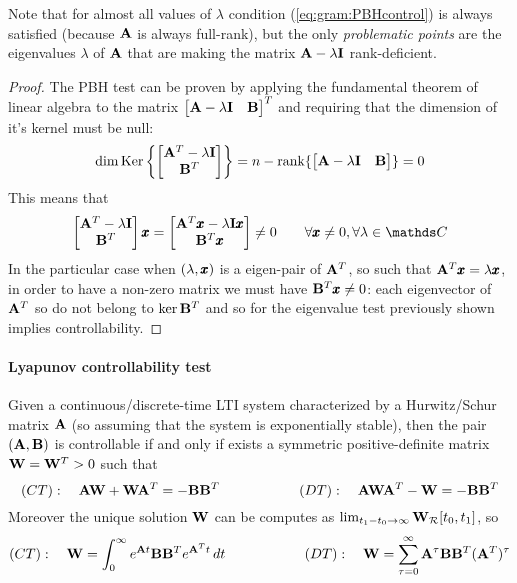 	Note that for almost all values of $\lambda$ condition (\ref{eq:gram:PBHcontrol}) is always satisfied (because $\mathbf{A}$ is always full-rank), but the only \textit{problematic points} are the eigenvalues $\lambda$ of $\mathbf{A}$ that are making the matrix $\mathbf{A}-\lambda\mathbf{I}$ rank-deficient.
	
	\begin{proof}
		The PBH test can be proven by applying the fundamental theorem of linear algebra to the matrix $\begin{bmatrix} \mathbf{A}-\lambda\mathbf{I}&\mathbf{B} \end{bmatrix}^T$ and requiring that the dimension of it's kernel must be null:
		\[ \dim \textrm{Ker}\left\{\begin{bmatrix} \mathbf{A}^T-\lambda \mathbf{I} \\ \mathbf{B}^T \end{bmatrix}\right\} = n - \textrm{rank}\{\begin{bmatrix} \mathbf{A}-\lambda\mathbf{I} & \mathbf{B} \end{bmatrix}\} = 0 \]
		This means that
		\[ \matrix{\A^T-\lambda\I \\ \B^T} \x = \matrix{\A^T \x - \lambda\I\x \\ \B^T\x} \neq 0 \qquad \forall \x \neq 0, \forall \lambda \in \mathds C \]
		In the particular case when $(\lambda,\pmb{x})$ is a eigen-pair of $\mathbf{A}^T$, so such that $\mathbf{A}^T\pmb{x} = \lambda\pmb{x}$, in order to have a non-zero matrix we must have $\mathbf{B}^T\pmb{x} \neq 0$: each eigenvector of $\mathbf{A}^T$ so do not belong to $\ker \mathbf{B}^T$ and so for the eigenvalue test previously shown implies controllability.		
	\end{proof}

	\paragraph{Lyapunov controllability test} Given a continuous/discrete-time LTI system characterized by a Hurwitz/Schur matrix $\mathbf{A}$ (so assuming that the system is exponentially stable), then the pair $(\mathbf{A},\mathbf{B})$ is controllable if and only if exists a symmetric positive-definite matrix $\mathbf{W} = \mathbf{W}^T > 0$ such that
	\begin{equation} \label{eq:gram:temp6}
		(CT):\quad \mathbf{A} \mathbf{W} + \mathbf{W} \mathbf{A}^T = - \mathbf{B}\mathbf{B}^T \hspace{2cm} (DT): \quad \mathbf{A} \mathbf{W} \mathbf{A}^T - \mathbf{W} = - \mathbf{B} \mathbf{B}^T
	\end{equation}
	Moreover the unique solution $\mathbf{W}$ can be computes as $\lim_{t_1-t_0\rightarrow \infty} \mathbf{W}_\mathcal R[t_0,t_1]$, so
	\begin{equation} \label{eq:gram:temp7}
		(CT):\quad \mathbf{W} = \int_0^\infty e^{\mathbf{A} t} \mathbf{B}\mathbf{B}^T e^{\mathbf{A}^Tt}\, dt \hspace{2cm} (DT):\quad \mathbf{W} = \sum_{\tau = 0}^\infty \mathbf{A}^\tau\mathbf{B}\mathbf{B}^T(\mathbf{A}^T)^\tau
	\end{equation}
	
